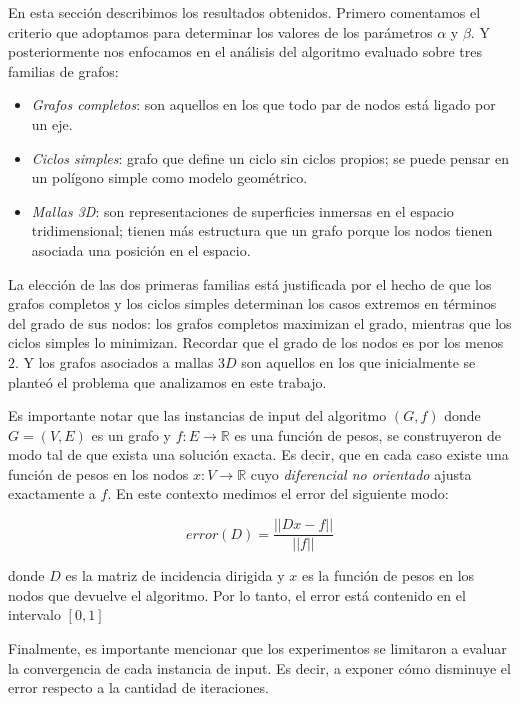 \documentclass[10pt, a4paper, twocolumn]{article} %
\begin{document}
En esta sección describimos los resultados obtenidos. Primero 
comentamos el criterio que adoptamos para determinar los valores de los 
parámetros $\alpha$ y $\beta$. Y posteriormente nos enfocamos en el 
análisis del algoritmo evaluado sobre tres familias de grafos: 

\begin{itemize}
	\item \emph{Grafos completos}: son aquellos en los que todo par de  
	nodos está ligado por un eje.
	\item \emph{Ciclos simples}: grafo que define un ciclo sin ciclos 
	propios; se puede pensar en un polígono simple como modelo 
	geométrico.
	\item \emph{Mallas 3D}: son representaciones de superficies 
	inmersas en el espacio tridimensional; tienen más estructura que un 
	grafo porque los nodos tienen asociada una posición en el espacio.
\end{itemize}

La elección de las dos primeras familias está justificada por el hecho 
de que los grafos completos y los ciclos simples determinan los casos 
extremos en términos del grado de sus nodos: los grafos completos 
maximizan el grado, mientras que los ciclos simples lo minimizan. 
Recordar que el grado de los nodos es por los menos $2$. Y los grafos 
asociados a mallas $3D$ son aquellos en los que inicialmente se planteó 
el problema que analizamos en este trabajo.

\smallskip

Es importante notar que las instancias de input del algoritmo $(G,f)$ 
donde $G=(V,E)$ es un grafo y $f: E \rightarrow \mathbb{R}$ es una 
función de pesos, se construyeron de modo tal de que exista una 
solución exacta. Es decir, que en cada caso existe una función de pesos 
en los nodos $x: V \rightarrow \mathbb{R}$ cuyo \textit{diferencial no 
orientado} ajusta exactamente a $f$. En este contexto medimos el error 
del siguiente modo:

$$error(D) = \frac{||Dx-f||}{||f||}$$

donde $D$ es la matriz de incidencia dirigida y $x$ es la función de 
pesos en los nodos que devuelve el algoritmo. Por lo tanto, el error 
está contenido en el intervalo $[0,1]$

\smallskip

Finalmente, es importante mencionar que los experimentos se limitaron a 
evaluar la convergencia de cada instancia de input. Es decir, a exponer 
cómo disminuye el error respecto a la cantidad de iteraciones.
\end{document}
